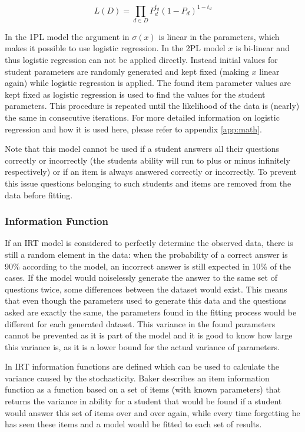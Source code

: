\documentclass{scrartcl}
\begin{document}
\begin{equation}
\label{eq:likely}
L(D)=\prod_{d \in D} P_{d}^{t_d}  (1- P_{d})^{1-t_d}
\end{equation}

In the 1PL model the argument in $\sigma(x)$ is linear in the parameters, which makes it possible to use logistic regression. In the 2PL model $x$ is bi-linear and thus logistic regression can not be applied directly. Instead initial values for student parameters are randomly generated and kept fixed (making $x$ linear again) while logistic regression is applied. The found item parameter values are kept fixed as logistic regression is used to find the values for the student parameters. This procedure is repeated until the likelihood of the data is (nearly) the same in consecutive iterations. For more detailed information on logistic regression and how it is used here, please refer to appendix \ref{app:math}.

Note that this model cannot be used if a student answers all their questions correctly or incorrectly (the students ability will run to plus or minus infinitely respectively) or if an item is always answered correctly or incorrectly. To prevent this issue questions belonging to such students and items are removed from the data before fitting.

\subsubsection{Information Function}
\label{sec:inherent}
If an IRT model is considered to perfectly determine the observed data, there is still a random element in the data: when the probability of a correct answer is 90\% according to the model, an incorrect answer is still expected in 10\% of the cases. If the model would noiselessly generate the answer to the same set of questions twice, some differences between the dataset would exist. This means that even though the parameters used to generate this data and the questions asked are exactly the same, the parameters found in the fitting process would be different for each generated dataset. This variance in the found parameters cannot be prevented as it is part of the model and it is good to know how large this variance is, as it is a lower bound for the actual variance of parameters.  

In IRT information functions are defined which can be used to calculate the variance caused by the stochasticity. Baker \cite{basicbaker} describes an item information function as a function based on a set of items (with known parameters) that returns the variance in ability for a student that would be found if a student would answer this set of items over and over again, while every time forgetting he has seen these items and a model would be fitted to each set of results. 
\end{document}
